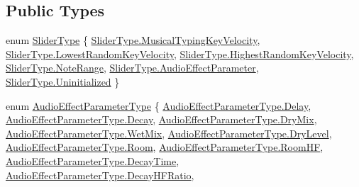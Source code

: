 \subsection*{Public Types}
\begin{DoxyCompactItemize}
\item 
enum \hyperlink{class_a_t_i_ac4c6056a99cbd16ff0d292d33b038b9b}{Slider\+Type} \{ \hyperlink{class_a_t_i_ac4c6056a99cbd16ff0d292d33b038b9ba61dadc525270178e43170b5e526ffd65}{Slider\+Type.\+Musical\+Typing\+Key\+Velocity}, 
\hyperlink{class_a_t_i_ac4c6056a99cbd16ff0d292d33b038b9ba3bd0052ff77dc6cbadd8cba0e83df8bf}{Slider\+Type.\+Lowest\+Random\+Key\+Velocity}, 
\hyperlink{class_a_t_i_ac4c6056a99cbd16ff0d292d33b038b9bafe4cbd1b61b948e3085a77dda6771509}{Slider\+Type.\+Highest\+Random\+Key\+Velocity}, 
\hyperlink{class_a_t_i_ac4c6056a99cbd16ff0d292d33b038b9baed3eb9f66592b75bf68921af4a9ad9af}{Slider\+Type.\+Note\+Range}, 
\hyperlink{class_a_t_i_ac4c6056a99cbd16ff0d292d33b038b9ba40a35c1bf645330106f0469af7242ed2}{Slider\+Type.\+Audio\+Effect\+Parameter}, 
\hyperlink{class_a_t_i_ac4c6056a99cbd16ff0d292d33b038b9baf704f57ea420275ad51bf55b7dec2c96}{Slider\+Type.\+Uninitialized}
 \}
\item 
enum \hyperlink{class_a_t_i_a1123d61b8dceb5867a3683e8d2224ee1}{Audio\+Effect\+Parameter\+Type} \{ \newline
\hyperlink{class_a_t_i_a1123d61b8dceb5867a3683e8d2224ee1a8f497c1a3d15af9e0c215019f26b887d}{Audio\+Effect\+Parameter\+Type.\+Delay}, 
\hyperlink{class_a_t_i_a1123d61b8dceb5867a3683e8d2224ee1a657f1228bb53523274ae58bcd123ae81}{Audio\+Effect\+Parameter\+Type.\+Decay}, 
\hyperlink{class_a_t_i_a1123d61b8dceb5867a3683e8d2224ee1a61407ee9ab251b02949859e14b1419ab}{Audio\+Effect\+Parameter\+Type.\+Dry\+Mix}, 
\hyperlink{class_a_t_i_a1123d61b8dceb5867a3683e8d2224ee1a22695b8db9895b01524771362145522b}{Audio\+Effect\+Parameter\+Type.\+Wet\+Mix}, 
\hyperlink{class_a_t_i_a1123d61b8dceb5867a3683e8d2224ee1ae47743520d3e3ed5fc5312bfe97cb3ce}{Audio\+Effect\+Parameter\+Type.\+Dry\+Level}, 
\hyperlink{class_a_t_i_a1123d61b8dceb5867a3683e8d2224ee1acc3abcf4426bff80257d22999d0eda8f}{Audio\+Effect\+Parameter\+Type.\+Room}, 
\hyperlink{class_a_t_i_a1123d61b8dceb5867a3683e8d2224ee1a90e34dcf9d48efd832a9736ab745715f}{Audio\+Effect\+Parameter\+Type.\+Room\+HF}, 
\hyperlink{class_a_t_i_a1123d61b8dceb5867a3683e8d2224ee1a54c655e04d554526f018753dabfdd452}{Audio\+Effect\+Parameter\+Type.\+Decay\+Time}, 
\hyperlink{class_a_t_i_a1123d61b8dceb5867a3683e8d2224ee1a2571ca579e535a3eba3383aa2e6b6f97}{Audio\+Effect\+Parameter\+Type.\+Decay\+H\+F\+Ratio}, 

\end{DoxyCompactItemize}
